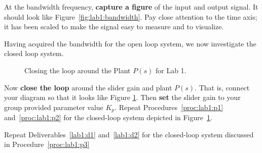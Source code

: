 %
\begin{deliverable}[label={lab1:d2}]
  At the bandwidth frequency,
  \textbf{capture a figure} of the input and output signal. It should look
  like Figure~\ref{fig:lab1:bandwidth}. Pay close attention to the time
  axis; it has been scaled to make the signal easy to measure and to visualize.
\end{deliverable}
%
Having acquired the bandwidth for the open loop system, we now investigate
the closed loop system.
%
\begin{figure}
  \centering
  \caption[Closed-Loop Diagram for Lab 1]{
    Closing the loop around the Plant \(P(s)\) for Lab 1.
  }
  \label{fig:lab1:closing-loop}
\end{figure}
%
\begin{procedure}[label={proc:lab1:p3}]
  Now \textbf{close the loop} around the slider gain and plant \(P(s).\) That
  is, connect your diagram so that it looks like Figure
  \ref{fig:lab1:closing-loop}. Then \textbf{set} the slider gain to
  your group provided parameter value \(K_p.\)
  Repeat Procedures~\ref{proc:lab1:p1} and~\ref{proc:lab1:p2} for the
  closed-loop system depicted in Figure~\ref{fig:lab1:closing-loop}.
\end{procedure}
%
\begin{deliverable}[label={lab1:d3}]
  Repeat Deliverables~\ref{lab1:d1} and~\ref{lab1:d2} for the closed-loop
  system discussed in Procedure~\ref{proc:lab1:p3}
\end{deliverable}

